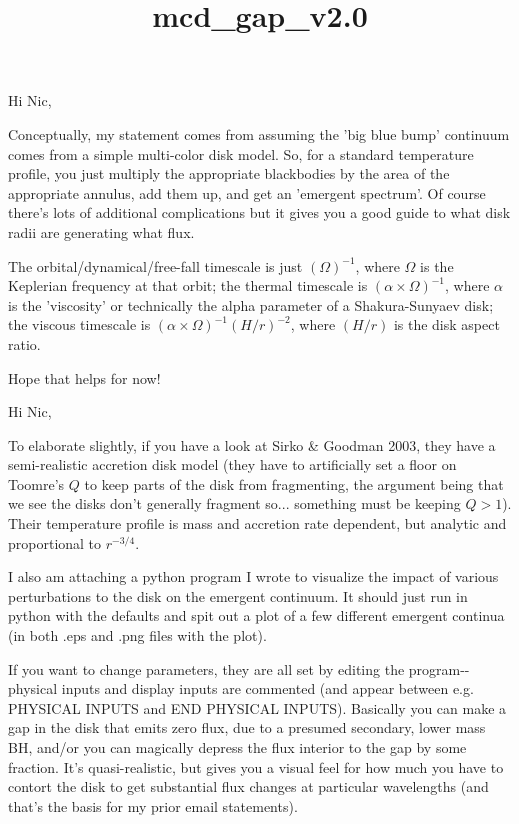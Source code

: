 \documentclass[11pt]{article}
\title{mcd\_gap\_v2.0}
\begin{document}
    
    
    \maketitle
    
    

    
    Hi Nic,

Conceptually, my statement comes from assuming the 'big blue bump'
continuum comes from a simple multi-color disk model. So, for a standard
temperature profile, you just multiply the appropriate blackbodies by
the area of the appropriate annulus, add them up, and get an 'emergent
spectrum'. Of course there's lots of additional complications but it
gives you a good guide to what disk radii are generating what flux.

The orbital/dynamical/free-fall timescale is just \((\Omega)^{-1}\),
where \(\Omega\) is the Keplerian frequency at that orbit; the thermal
timescale is \((\alpha \times \Omega)^{-1}\), where \(\alpha\) is the
'viscosity' or technically the alpha parameter of a Shakura-Sunyaev
disk; the viscous timescale is
\((\alpha \times \Omega)^{-1} (H/r)^{-2}\), where \((H/r)\) is the disk
aspect ratio.

Hope that helps for now!

    Hi Nic,

To elaborate slightly, if you have a look at Sirko \& Goodman 2003, they
have a semi-realistic accretion disk model (they have to artificially
set a floor on Toomre's \(Q\) to keep parts of the disk from
fragmenting, the argument being that we see the disks don't generally
fragment so... something must be keeping \(Q>1\)). Their temperature
profile is mass and accretion rate dependent, but analytic and
proportional to \(r^{-3/4}\).

I also am attaching a python program I wrote to visualize the impact of
various perturbations to the disk on the emergent continuum. It should
just run in python with the defaults and spit out a plot of a few
different emergent continua (in both .eps and .png files with the plot).

If you want to change parameters, they are all set by editing the
program-\/-physical inputs and display inputs are commented (and appear
between e.g. PHYSICAL INPUTS and END PHYSICAL INPUTS). Basically you can
make a gap in the disk that emits zero flux, due to a presumed
secondary, lower mass BH, and/or you can magically depress the flux
interior to the gap by some fraction. It's quasi-realistic, but gives
you a visual feel for how much you have to contort the disk to get
substantial flux changes at particular wavelengths (and that's the basis
for my prior email statements).
\end{document}
